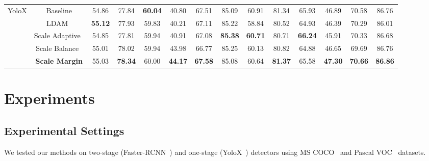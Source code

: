 \documentclass{article}
\begin{document}
\begin{table}[!htbp]
\begin{center}
{\begin{tabular}{c|c|c|c|c|c|c|c|c|c|c|c|c|c}
                \midrule
                
                \multirow{5}{*}{YoloX} & Baseline                             & 54.86 & 77.84 & \textbf{60.04} & 40.80 & 67.51 & 85.09 & 60.91 & 81.34 & 65.93 & 46.89 & 70.58 & 86.76 \\ \cline{2-2}
            
                                       & LDAM~\cite{cao2019learning}          & \textbf{55.12} & 77.93 & 59.83 & 40.21 & 67.11 & 85.22 & 58.84 & 80.52 & 64.93 & 46.39 & 70.29 & 86.01 \\ \cline{2-2}

                                       & Scale Adaptive~\cite{lv2020small}    & 54.85 & 77.81 & 59.94 & 40.91 & 67.08 & \textbf{85.38} & \textbf{60.71} & 80.71 & \textbf{66.24} & 45.91 & 70.33 & 86.68 \\ \cline{2-2}

                                       & Scale Balance~\cite{shuang2021scale} & 55.01 & 78.02 & 59.94 & 43.98 & 66.77 & 85.25 & 60.13 & 80.82 & 64.88 & 46.65 & 69.69 & 86.76 \\ \cline{2-2}

                                       & \textbf{Scale Margin}                & 55.03 & \textbf{78.34} & 60.00 &\textbf{44.17} & \textbf{67.58} & 85.08 & 60.64 & \textbf{81.37} & 65.58 & \textbf{47.30} & \textbf{70.66} & \textbf{86.86} \\

                \bottomrule
            \end{tabular}}
	\end{center}
\end{table}

\section{Experiments}
\label{section_4}
\subsection{Experimental Settings}
\label{section_4_1}


We tested our methods on two-stage (Faster-RCNN~\cite{ren2016faster}) and one-stage (YoloX~\cite{ge2021yolox}) detectors using MS COCO~\cite{lin2014microsoft} and Pascal VOC~\cite{everingham2010pascal} datasets.
\end{document}
